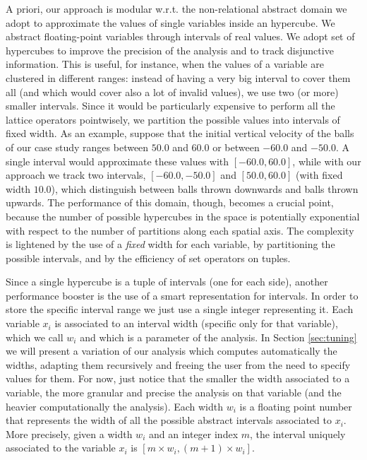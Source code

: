 A priori, our approach is modular w.r.t. the non-relational abstract domain we adopt to approximate the values of single variables inside an hypercube. We abstract floating-point variables through intervals of real values. We adopt set of hypercubes to improve the precision of the analysis and to track disjunctive information. This is useful, for instance, when the values of a variable are clustered in different ranges: instead of having a very big interval to cover them all (and which would cover also a lot of invalid values), we use two (or more) smaller intervals. Since it would be particularly expensive to perform all the lattice operators pointwisely, we partition the possible values into intervals of fixed width. As an example, suppose that the initial vertical velocity of the balls of our case study ranges between $50.0$ and $60.0$ or between $-60.0$ and $-50.0$. A single interval would approximate these values with $[-60.0,60.0]$, while with our approach we track two intervals, $[-60.0,-50.0]$ and $[50.0,60.0]$ (with fixed width $10.0$), which distinguish between balls thrown downwards and balls thrown upwards. The performance of this domain, though, becomes a crucial point, because the number of possible hypercubes in the space is potentially exponential with respect to the number of partitions along each spatial axis. The complexity is lightened by the use of a \emph{fixed} width for each variable, by partitioning the possible intervals, and by the efficiency of set operators on tuples.

Since a single hypercube is a tuple of intervals (one for each side), another performance booster is the use of a smart representation for intervals. In order to store the specific interval range we just use a single integer representing it. Each variable $x_i$ is associated to an interval width (specific only for that variable), which we call $w_i$ and which is a parameter of the analysis. In Section \ref{sec:tuning} we will present a variation of our analysis which computes automatically the widths, adapting them recursively and freeing the user from the need to specify values for them. For now, just notice that the smaller the width associated to a variable, the more granular and precise the analysis on that variable (and the heavier computationally the analysis). Each width $w_i$ is a floating point number that represents the width of all the possible abstract intervals associated to $x_i$. More precisely, given a width $w_i$ and an integer index $m$, the interval uniquely associated to the variable $x_i$ is $[m \times w_i, (m+1) \times w_i]$.

